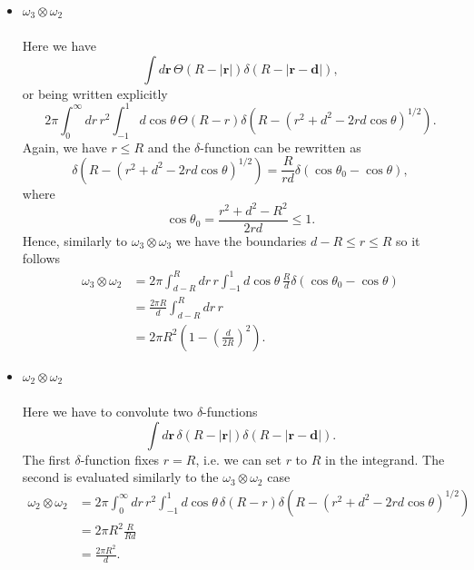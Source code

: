 \documentclass{article}
\begin{document}
\begin{itemize}
\begin{align*}
			\omega_3\otimes\omega_3 &= 2\pi\int_{d-R}^R dr\,r^2\int_{\frac{r^2+d^2-R^2}{2rd}}^1 d\cos\theta\\\nonumber
			&= \frac{\pi}{d}\int_{d-R}^R dr\,r(R^2-(r-d)^2)\\\nonumber
			&= \frac{4\pi}{3}R^3-\pi R^2 d + \frac{\pi}{12}d^3.
		\end{align*}
		As we expect, if $d=0$ we obtain the volume of a sphere of radius $R$ and for $d\geq 2R$ (no overlap) 0.
	\item $\omega_3\otimes\omega_2$\\\\
		Here we have
		\begin{equation*}
			\int d\mathbf{r}\,\Theta(R-|\mathbf{r}|)\delta(R-|\mathbf{r}-\mathbf{d}|),
		\end{equation*}
		or being written explicitly
		\begin{equation*}
			2\pi\int_0^\infty dr\,r^2\int_{-1}^1 d\cos\theta\,\Theta(R-r)\delta\left(R-(r^2+d^2-2rd\cos\theta)^{1/2}\right).
		\end{equation*}
		Again, we have $r\leq R$ and the $\delta$-function can be rewritten as
		\begin{equation*}
			\delta\left(R-(r^2+d^2-2rd\cos\theta)^{1/2}\right) = \frac{R}{rd}\delta(\cos\theta_0-\cos\theta),
		\end{equation*}
		where
		\begin{equation*}
			\cos\theta_0 = \frac{r^2+d^2-R^2}{2rd}\leq 1.
		\end{equation*}
		Hence, similarly to $\omega_3\otimes\omega_3$ we have the boundaries $d-R\leq r\leq R$ so it follows
		\begin{align*}
			\omega_3\otimes\omega_2 &= 2\pi\int_{d-R}^R dr\,r\int_{-1}^1d\cos\theta\,\frac{R}{d}\delta(\cos\theta_0-\cos\theta)\\\nonumber
			&= \frac{2\pi R}{d}\int_{d-R}^R dr\,r\\\nonumber
			&= 2\pi R^2\left(1-\left(\frac{d}{2R}\right)^2\right).	
		\end{align*}
		
		\item $\omega_2\otimes\omega_2$\\\\
			Here we have to convolute two $\delta$-functions
			\begin{equation*}
				\int d\mathbf{r}\,\delta(R-|\mathbf{r}|)\delta(R-|\mathbf{r}-\mathbf{d}|).
			\end{equation*} 
			The first $\delta$-function fixes $r=R$, i.e. we can set $r$ to $R$ in the integrand. The second is evaluated similarly to the $\omega_3\otimes\omega_2$ case 
			\begin{align*}
				\omega_2\otimes\omega_2 &= 2\pi\int_0^\infty dr\,r^2\int_{-1}^1 d\cos\theta\,\delta(R-r)\delta\left(R-(r^2+d^2-2rd\cos\theta)^{1/2}\right)\\\nonumber
				&= 2\pi R^2 \frac{R}{Rd}\\\nonumber
				&= \frac{2\pi R^2}{d}.
			\end{align*}
		
\end{itemize}
\end{document}
